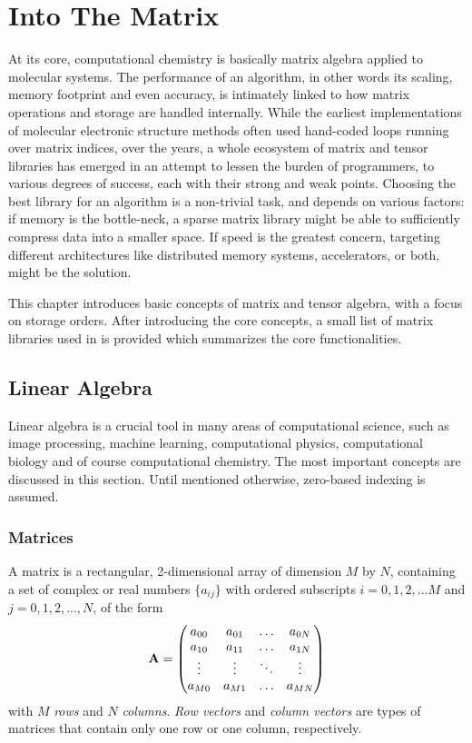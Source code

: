 \chapter{Into The Matrix}

At its core, computational chemistry is basically matrix algebra applied to molecular systems. The performance of an algorithm, in other words its scaling, memory footprint and even accuracy, is intimately linked to how matrix operations and storage are handled internally. While the earliest implementations of molecular electronic structure methods often used hand-coded loops running over matrix indices, over the years, a whole ecosystem of matrix and tensor libraries has emerged in an attempt to lessen the burden of programmers, to various degrees of success, each with their strong and weak points. Choosing the best library for an algorithm is a non-trivial task, and depends on various factors: if memory is the bottle-neck, a sparse matrix library might be able to sufficiently compress data into a smaller space. If speed is the greatest concern, targeting different architectures like distributed memory systems, accelerators, or both, might be the solution.

This chapter introduces basic concepts of matrix and tensor algebra, with a focus on storage orders. After introducing the core concepts, a small list of matrix libraries used in \mchem{} is provided which summarizes the core functionalities.

\section{Linear Algebra}

Linear algebra is a crucial tool in many areas of computational science, such as image processing, machine learning, computational physics, computational biology and of course computational chemistry. The most important concepts are discussed in this section. Until mentioned otherwise, zero-based indexing is assumed. 

\subsection{Matrices}

A matrix is a rectangular, 2-dimensional array of dimension $M$ by $N$, containing a set of complex or real numbers $\{a_{ij}\}$ with ordered subscripts $i = 0,1,2,...M$ and $j = 0,1,2,...,N$, of the form
\begin{equation}
\mathbf{A} = \begin{pmatrix}
a_{00} & a_{01} & \ldots & a_{0N} \\
a_{10} & a_{11} & \ldots & a_{1N} \\
\vdots & \vdots & \ddots & \vdots \\
a_{M0} & a_{M1} & \ldots & a_{MN}
\end{pmatrix}
\end{equation}
\noindent with $M$ \emph{rows} and $N$ \emph{columns}. \emph{Row vectors} and \emph{column vectors} are types of matrices that contain only one row or one column, respectively. 

